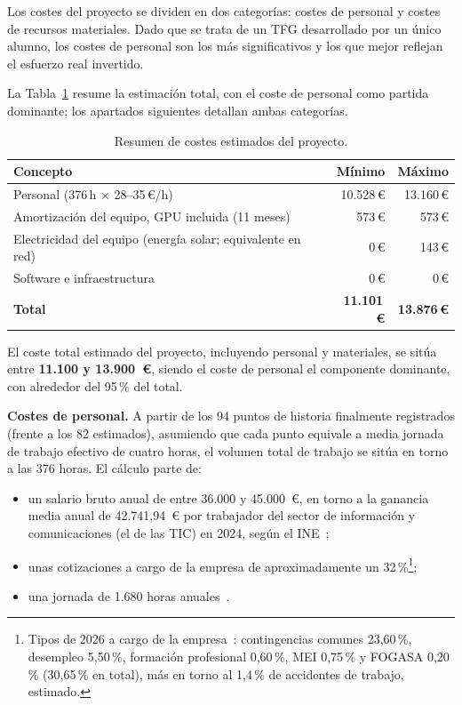 Los costes del proyecto se dividen en dos categorías: costes de personal y costes de recursos materiales. Dado que se trata de un TFG desarrollado por un único alumno, los costes de personal son los más significativos y los que mejor reflejan el esfuerzo real invertido.

La Tabla~\ref{tab:costes} resume la estimación total, con el coste de personal como partida dominante; los apartados siguientes detallan ambas categorías.

\begin{table}[!ht]
\centering
\begin{tabular}{lrr}
\hline
\textbf{Concepto} & \textbf{Mínimo} & \textbf{Máximo} \\
\hline
Personal (376\,h × 28--35\,€/h) & 10.528\,€ & 13.160\,€ \\
Amortización del equipo, GPU incluida (11 meses) & 573\,€ & 573\,€ \\
Electricidad del equipo (energía solar; equivalente en red) & 0\,€ & 143\,€ \\
Software e infraestructura & 0\,€ & 0\,€ \\
\hline
\textbf{Total} & \textbf{11.101\,€} & \textbf{13.876\,€} \\
\hline
\end{tabular}
\caption{Resumen de costes estimados del proyecto.}
\label{tab:costes}
\end{table}

El coste total estimado del proyecto, incluyendo personal y materiales, se sitúa entre \textbf{11.100 y 13.900~€}, siendo el coste de personal el componente dominante, con alrededor del 95\,\% del total.

\textbf{Costes de personal.} A partir de los 94 puntos de historia finalmente registrados (frente a los 82 estimados), asumiendo que cada punto equivale a media jornada de trabajo efectivo de cuatro horas, el volumen total de trabajo se sitúa en torno a las 376 horas. El cálculo parte de:

\begin{itemize}
 \item un salario bruto anual de entre 36.000 y 45.000~€, en torno a la ganancia media anual de 42.741,94~€ por trabajador del sector de información y comunicaciones (el de las TIC) en 2024, según el INE~\cite{ineeaes2024};
 \item unas cotizaciones a cargo de la empresa de aproximadamente un 32\,\%\footnote{Tipos de 2026 a cargo de la empresa~\cite{ordencotizacion2026}: contingencias comunes 23,60\,\%, desempleo 5,50\,\%, formación profesional 0,60\,\%, MEI 0,75\,\% y FOGASA 0,20\,\% (30,65\,\% en total), más en torno al 1,4\,\% de accidentes de trabajo, estimado.};
 \item una jornada de 1.680 horas anuales~\cite{estatutotrabajadores2015}.
\end{itemize}

